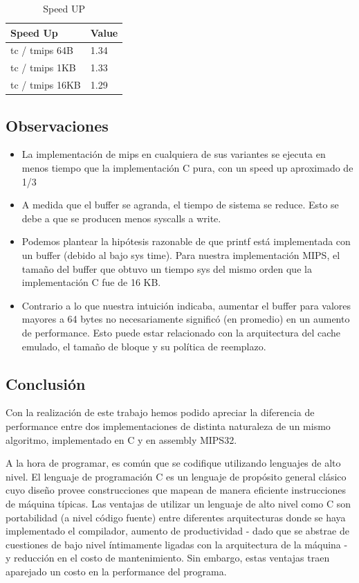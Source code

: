 \documentclass{article}
\begin{document}
\clearpage


\begin{table}[htbp]
\begin{center}
\begin{tabular}{|l|l|}
\hline
Speed Up & Value \\
\hline \hline
tc / tmips 64B & 1.34 \\ \hline
tc / tmips 1KB & 1.33 \\ \hline
tc / tmips 16KB & 1.29 \\ \hline

\end{tabular}
\caption{Speed UP}
\end{center}
\end{table}

\subsection{Observaciones}
\begin{itemize}
\item La implementación de mips en cualquiera de sus variantes se ejecuta en menos tiempo que la implementación C pura, con un speed up aproximado de 1/3
\item A medida que el buffer se agranda, el tiempo de sistema se reduce. Esto se debe a que se producen menos syscalls a write.
\item Podemos plantear la hipótesis razonable de que printf está implementada con un buffer (debido al bajo sys time). Para nuestra implementación MIPS, el tamaño del buffer que obtuvo un tiempo sys del mismo orden que la implementación C fue de 16 KB.
\item Contrario a lo que nuestra intuición indicaba, aumentar el buffer para valores mayores a 64 bytes no necesariamente significó (en promedio) en un aumento de performance. Esto puede estar relacionado con la arquitectura del cache emulado, el tamaño de bloque  y su política de reemplazo.
\end{itemize}

\clearpage
\subsection{Conclusión}


Con la realización de este trabajo hemos podido apreciar la diferencia de performance entre dos implementaciones de distinta naturaleza de un mismo algoritmo, implementado en C y en assembly MIPS32.


A la hora de programar, es común que se codifique utilizando lenguajes de alto nivel. El lenguaje de programación C es un lenguaje de propósito general clásico cuyo diseño provee construcciones que mapean de manera eficiente instrucciones de máquina típicas. Las ventajas de utilizar un lenguaje de alto nivel como C son portabilidad (a nivel código fuente) entre diferentes arquitecturas donde se haya implementado el compilador, aumento de productividad - dado que se abstrae de cuestiones de bajo nivel íntimamente ligadas con la arquitectura de la máquina - y reducción en el costo de mantenimiento. Sin embargo, estas ventajas traen aparejado un costo en la performance del programa.
\end{document}
